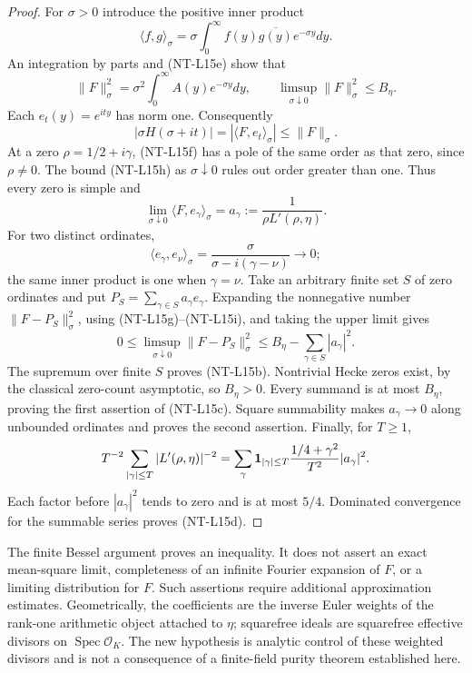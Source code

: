 \begin{proof}
For $\sigma>0$ introduce the positive inner product
\[
 \langle f,g\rangle_\sigma
       =\sigma\int_0^\infty f(y)\overline{g(y)}e^{-\sigma y}dy.
\]
An integration by parts and (NT-L15e) show that
\[
 \|F\|_\sigma^2
   =\sigma^2\int_0^\infty A(y)e^{-\sigma y}dy,
 \qquad \limsup_{\sigma\downarrow0}\|F\|_\sigma^2\le B_\eta.
                                                        \tag{NT-L15g}
\]
Each $e_t(y)=e^{ity}$ has norm one. Consequently
\[
 |\sigma H(\sigma+it)|
       =|\langle F,e_t\rangle_\sigma|
       \le\|F\|_\sigma.
                                                        \tag{NT-L15h}
\]
At a zero $\rho=1/2+i\gamma$, (NT-L15f) has a pole of the same order
as that zero, since $\rho\ne0$. The bound (NT-L15h) as
$\sigma\downarrow0$ rules out order greater than one. Thus every zero
is simple and
\[
 \lim_{\sigma\downarrow0}\langle F,e_\gamma\rangle_\sigma
       =a_\gamma:=\frac1{\rho L'(\rho,\eta)}.
                                                        \tag{NT-L15i}
\]
For two distinct ordinates,
\[
 \langle e_\gamma,e_\nu\rangle_\sigma
       =\frac\sigma{\sigma-i(\gamma-\nu)}\longrightarrow0;
\]
the same inner product is one when $\gamma=\nu$.
Take an arbitrary finite set $S$ of zero ordinates and put
$P_S=\sum_{\gamma\in S}a_\gamma e_\gamma$.
Expanding the nonnegative number $\|F-P_S\|_\sigma^2$, using
(NT-L15g)--(NT-L15i), and taking the upper limit gives
\[
 0\le\limsup_{\sigma\downarrow0}\|F-P_S\|_\sigma^2
       \le B_\eta-\sum_{\gamma\in S}|a_\gamma|^2.
\]
The supremum over finite $S$ proves (NT-L15b). Nontrivial Hecke zeros
exist, by the classical zero-count asymptotic, so $B_\eta>0$.
Every summand is at most $B_\eta$, proving the first assertion of
(NT-L15c). Square summability makes $a_\gamma\to0$ along unbounded
ordinates and proves the second assertion. Finally, for $T\ge1$,
\[
 T^{-2}\sum_{|\gamma|\le T}|L'(\rho,\eta)|^{-2}
   =\sum_\gamma {\bf1}_{|\gamma|\le T}
           \frac{1/4+\gamma^2}{T^2}|a_\gamma|^2.
\]
Each factor before $|a_\gamma|^2$ tends to zero and is at most $5/4$.
Dominated convergence for the summable series proves (NT-L15d).
\end{proof}

The finite Bessel argument proves an inequality. It does not assert an
exact mean-square limit, completeness of an infinite Fourier expansion
of $F$, or a limiting distribution for $F$. Such assertions require
additional approximation estimates.
Geometrically, the coefficients are the inverse Euler weights of the
rank-one arithmetic object attached to $\eta$; squarefree ideals are
squarefree effective divisors on $\operatorname{Spec}\mathcal O_K$.
The new hypothesis is analytic control of these weighted divisors and
is not a consequence of a finite-field purity theorem established here.

